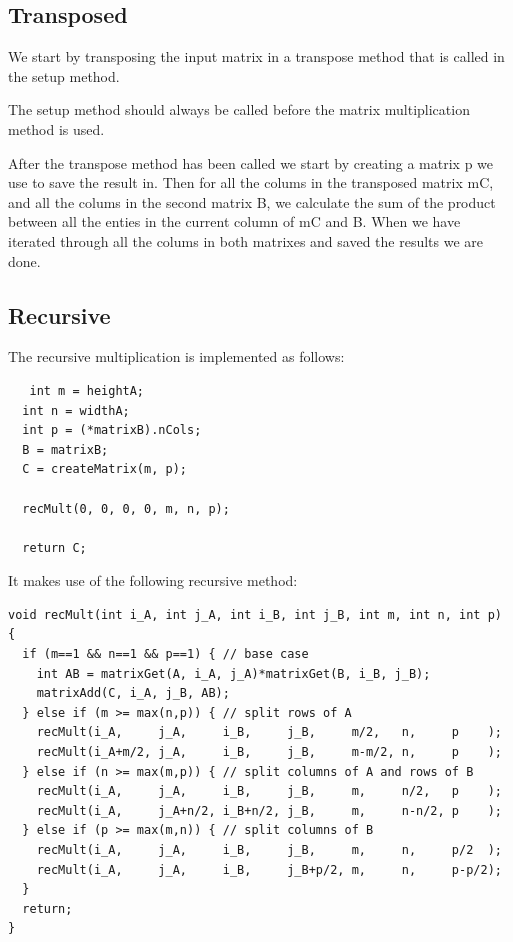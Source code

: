 \subsection{Transposed}

We start by transposing the input matrix in a transpose method that is called in the setup method.

The setup method should always be called before the matrix multiplication method is used.

After the transpose method has been called we start by creating a matrix p we use to save the result in.
Then for all the colums in the transposed matrix mC, and all the colums in the second matrix B, we calculate the sum of the product between all the enties in the current column of mC and B.
When we have iterated through all the colums in both matrixes and saved the results we are done.



\subsection{Recursive}
The recursive multiplication is implemented as follows:
\begin{verbatim}
   int m = heightA;
  int n = widthA;
  int p = (*matrixB).nCols;
  B = matrixB;
  C = createMatrix(m, p);
  
  recMult(0, 0, 0, 0, m, n, p);
  
  return C;
\end{verbatim}

It makes use of the following recursive method:
\begin{verbatim}
void recMult(int i_A, int j_A, int i_B, int j_B, int m, int n, int p) {
  if (m==1 && n==1 && p==1) { // base case
    int AB = matrixGet(A, i_A, j_A)*matrixGet(B, i_B, j_B);
    matrixAdd(C, i_A, j_B, AB);
  } else if (m >= max(n,p)) { // split rows of A
    recMult(i_A,     j_A,     i_B,     j_B,     m/2,   n,     p    );
    recMult(i_A+m/2, j_A,     i_B,     j_B,     m-m/2, n,     p    );
  } else if (n >= max(m,p)) { // split columns of A and rows of B
    recMult(i_A,     j_A,     i_B,     j_B,     m,     n/2,   p    );
    recMult(i_A,     j_A+n/2, i_B+n/2, j_B,     m,     n-n/2, p    );
  } else if (p >= max(m,n)) { // split columns of B
    recMult(i_A,     j_A,     i_B,     j_B,     m,     n,     p/2  );
    recMult(i_A,     j_A,     i_B,     j_B+p/2, m,     n,     p-p/2);
  }
  return;
}
\end{verbatim}



